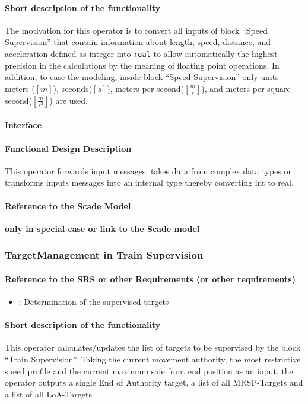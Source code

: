 \paragraph{Short description of the functionality}
The motivation for this operator is to convert all inputs of block ``Speed Supervision'' that contain information about length, speed, distance, and acceleration defined as integer into \texttt{real} to allow automatically the highest precision in the calculations by the meaning of floating point operations. In addition, to ease the modeling, inside block ``Speed Supervision'' only units meters ($[m]$), seconds($[s]$), meters per second($[\frac{m}{s}]$), and meters per square second($[\frac{m}{s^{2}}]$) are used.

\paragraph{Interface}

\paragraph{Functional Design Description}
This operator forwards input messages, takes data from complex data types or transforms inputs messages into an internal type thereby converting int to real.
  
\paragraph{Reference to the Scade Model}
\textbf{only in special case or link to the Scade model}

\subsubsection{TargetManagement in Train Supervision}
\paragraph{Reference to the SRS or other Requirements (or other requirements)}
\begin{itemize}
	\item \cite[Chapt.~3.13.8.2]{subset-026}: Determination of the supervised targets 
\end{itemize}

\paragraph{Short description of the functionality}
This operator calculates/updates the list of targets to be supervised by the block ``Train Supervision''. Taking the current movement authority, the most restrictive speed profile and the current maximum safe front end position as an input, the operator outputs a single End of Authority target, a list of all MRSP-Targets and a list of all LoA-Targets.
  
